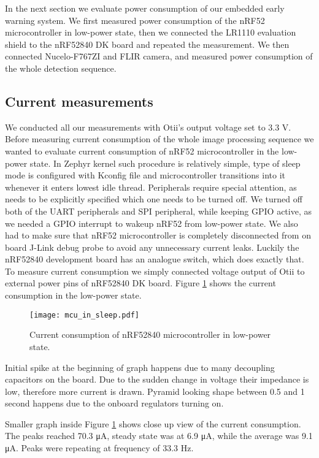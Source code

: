 In the next section we evaluate power consumption of our embedded early warning system.
We first measured power consumption of the nRF52 microcontroller in low-power state, then we connected the LR1110 evaluation shield to the nRF52840 DK board and repeated the measurement.
We then connected Nucelo-F767ZI and FLIR camera, and measured power consumption of the whole detection sequence.


\subsection{ Current measurements}

We conducted all our measurements with Otii's output voltage set to 3.3 V.
Before measuring current consumption of the whole image processing sequence we wanted to evaluate current consumption of nRF52 microcontroller in the low-power state.
In Zephyr kernel such procedure is relatively simple, type of sleep mode is configured with Kconfig file and microcontroller transitions into it whenever it enters lowest idle thread.
Peripherals require special attention, as needs to be explicitly specified which one needs to be turned off.
We turned off both of the UART peripherals and SPI peripheral, while keeping GPIO active, as we needed a GPIO interrupt to wakeup nRF52 from low-power state.
We also had to make sure that nRF52 microcontroller is completely disconnected from on board J-Link debug probe to avoid any unnecessary current leaks.
Luckily the nRF52840 development board has an analogue switch, which does exactly that.
To measure current consumption we simply connected voltage output of Otii to external power pins of nRF52840 DK board.
Figure \ref{mcu_in_sleep} shows the current consumption in the low-power state.

\begin{figure}[ht]
    \centering
    \texttt{[image: mcu\_in\_sleep.pdf]}
    \caption{ Current consumption of nRF52840 microcontroller in low-power state.}
    \label{mcu_in_sleep}
\end{figure}

Initial spike at the beginning of graph happens due to many decoupling capacitors on the board.
Due to the sudden change in voltage their impedance is low, therefore more current is drawn.
Pyramid looking shape between 0.5 and 1 second happens due to the onboard regulators turning on.

Smaller graph inside Figure \ref{mcu_in_sleep} shows close up view of the current consumption.
The peaks reached 70.3 \si{\micro\ampere}, steady state was at 6.9 \si{\micro\ampere}, while the average was 9.1 \si{\micro\ampere}.
Peaks were repeating at frequency of 33.3 \si{\hertz}.


